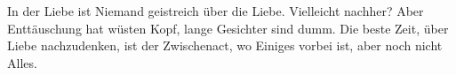 In der Liebe ist Niemand geistreich über die Liebe. Vielleicht nachher? Aber Enttäuschung hat wüsten Kopf, lange Gesichter sind dumm. Die beste Zeit, über Liebe nachzudenken, ist der Zwischenact, wo Einiges vorbei ist, aber noch nicht Alles.
\par

